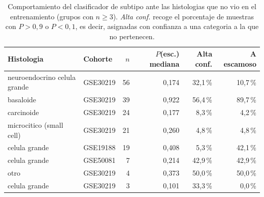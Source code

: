 \begin{table}[htbp]
\centering
\caption[Histologias excluidas del clasificador de subtipo]{Comportamiento del
clasificador de subtipo ante las histologias que no vio en el entrenamiento
(grupos con $n\geq3$). \emph{Alta conf.} recoge el porcentaje de muestras con
$P>0{,}9$ o $P<0{,}1$, es decir, asignadas con confianza a una categoria a la
que no pertenecen.}
\label{tab:dificiles}
\small
\begin{tabular}{llrrrr}
\toprule
Histologia & Cohorte & $n$ & $P$(esc.) mediana & Alta conf. & A escamoso \\
\midrule
neuroendocrino celula grande & GSE30219 & 56 & 0,174 & 32,1\,\% & 10,7\,\% \\
basaloide & GSE30219 & 39 & 0,922 & 56,4\,\% & 89,7\,\% \\
carcinoide & GSE30219 & 24 & 0,177 & 8,3\,\% & 4,2\,\% \\
microcitico (small cell) & GSE30219 & 21 & 0,260 & 4,8\,\% & 4,8\,\% \\
celula grande & GSE19188 & 19 & 0,408 & 5,3\,\% & 42,1\,\% \\
celula grande & GSE50081 & 7 & 0,214 & 42,9\,\% & 42,9\,\% \\
otro & GSE30219 & 4 & 0,373 & 50,0\,\% & 50,0\,\% \\
celula grande & GSE30219 & 3 & 0,101 & 33,3\,\% & 0,0\,\% \\
\bottomrule
\end{tabular}
\end{table}
